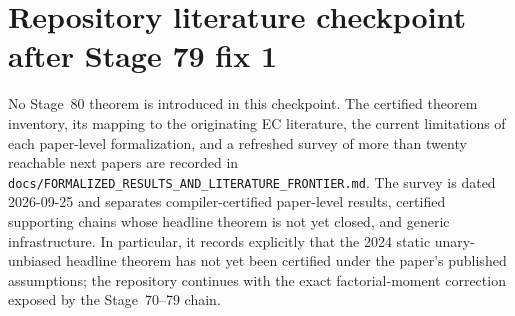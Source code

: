 \documentclass[11pt]{article}
\begin{document}
\section{Repository literature checkpoint after Stage 79 fix 1}

No Stage~80 theorem is introduced in this checkpoint.  The certified theorem inventory,
its mapping to the originating EC literature, the current limitations of each paper-level
formalization, and a refreshed survey of more than twenty reachable next papers are
recorded in
\texttt{docs/FORMALIZED\_RESULTS\_AND\_LITERATURE\_FRONTIER.md}.
The survey is dated 2026-09-25 and separates compiler-certified paper-level results,
certified supporting chains whose headline theorem is not yet closed, and generic
infrastructure.  In particular, it records explicitly that the 2024 static unary-unbiased
headline theorem has not yet been certified under the paper's published assumptions;
the repository continues with the exact factorial-moment correction exposed by the
Stage~70--79 chain.
\end{document}
